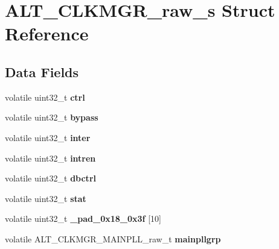 \hypertarget{structALT__CLKMGR__raw__s}{}\section{A\+L\+T\+\_\+\+C\+L\+K\+M\+G\+R\+\_\+raw\+\_\+s Struct Reference}
\label{structALT__CLKMGR__raw__s}
\subsection*{Data Fields}
\begin{DoxyCompactItemize}
\item 
\mbox{\label{structALT__CLKMGR__raw__s_a839010bea527a3e22fc11b91f7e9fad8}} 
volatile uint32\+\_\+t {\bfseries ctrl}
\item 
\mbox{\label{structALT__CLKMGR__raw__s_a861db59ec63bffd8691786bf096691d0}} 
volatile uint32\+\_\+t {\bfseries bypass}
\item 
\mbox{\label{structALT__CLKMGR__raw__s_af2517261c63fc10d68e220bcd88dc7b2}} 
volatile uint32\+\_\+t {\bfseries inter}
\item 
\mbox{\label{structALT__CLKMGR__raw__s_a10bdfa7b1ee07546e1537efdacaa9ce2}} 
volatile uint32\+\_\+t {\bfseries intren}
\item 
\mbox{\label{structALT__CLKMGR__raw__s_a7ff10387307f71a0dd6b8a8f59fd4290}} 
volatile uint32\+\_\+t {\bfseries dbctrl}
\item 
\mbox{\label{structALT__CLKMGR__raw__s_a811493721adbbcfc6c9cb9b8d3ae0066}} 
volatile uint32\+\_\+t {\bfseries stat}
\item 
\mbox{\label{structALT__CLKMGR__raw__s_a2b55e18848d79c7a7eae9510be3ea88e}} 
volatile uint32\+\_\+t {\bfseries \+\_\+pad\+\_\+0x18\+\_\+0x3f} \mbox{[}10\mbox{]}
\item 
\mbox{\label{structALT__CLKMGR__raw__s_ac4ecac03ec66ad24e8f0c6311385d334}} 
volatile A\+L\+T\+\_\+\+C\+L\+K\+M\+G\+R\+\_\+\+M\+A\+I\+N\+P\+L\+L\+\_\+raw\+\_\+t {\bfseries mainpllgrp}

\end{DoxyCompactItemize}
